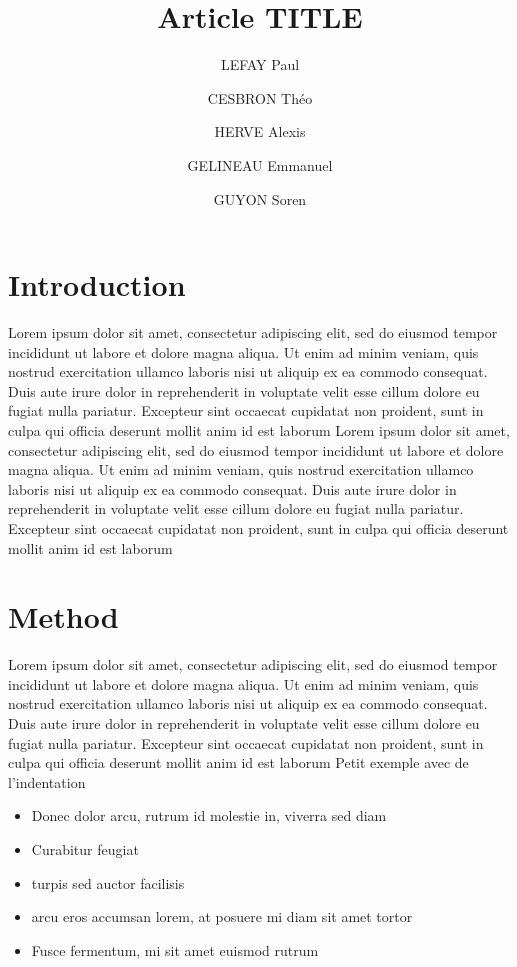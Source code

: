 \documentclass[twoside,twocolumn]{article}                          %
\title{Article TITLE}
\author[1]{LEFAY Paul}
\author[1]{CESBRON Théo}
\author[2]{HERVE Alexis}
\author[2]{GELINEAU Emmanuel}
\author[2]{GUYON Soren}
\affil[1]{DSMT}
\affil[2]{EOC}
\affil[3]{CSS}
\begin{document}
\renewcommand\thesection{\Roman{section}}                           %
\renewcommand\thesubsection{\roman{subsection}}                     %


\cfoot{\thepage}

\maketitle{}										                                    %

\newpage
\section{Introduction}
Lorem ipsum dolor sit amet, consectetur adipiscing elit, sed do eiusmod tempor incididunt ut labore et dolore magna aliqua. Ut enim ad minim veniam, quis nostrud exercitation ullamco laboris nisi ut aliquip ex ea commodo consequat. Duis aute irure dolor in reprehenderit in voluptate velit esse cillum dolore eu fugiat nulla pariatur. Excepteur sint occaecat cupidatat non proident, sunt in culpa qui officia deserunt mollit anim id est laborum
Lorem ipsum dolor sit amet, consectetur adipiscing elit, sed do eiusmod tempor incididunt ut labore et dolore magna aliqua. Ut enim ad minim veniam, quis nostrud exercitation ullamco laboris nisi ut aliquip ex ea commodo consequat. Duis aute irure dolor in reprehenderit in voluptate velit esse cillum dolore eu fugiat nulla pariatur. Excepteur sint occaecat cupidatat non proident, sunt in culpa qui officia deserunt mollit anim id est laborum

\section{Method}
Lorem ipsum dolor sit amet, consectetur adipiscing elit, sed do eiusmod tempor incididunt ut labore et dolore magna aliqua. Ut enim ad minim veniam, quis nostrud exercitation ullamco laboris nisi ut aliquip ex ea commodo consequat. Duis aute irure dolor in reprehenderit in voluptate velit esse cillum dolore eu fugiat nulla pariatur. Excepteur sint occaecat cupidatat non proident, sunt in culpa qui officia deserunt mollit anim id est laborum
Petit exemple avec de l'indentation
\begin{itemize}
  \item Donec dolor arcu, rutrum id molestie in, viverra sed diam
  \item Curabitur feugiat
  \item turpis sed auctor facilisis
  \item arcu eros accumsan lorem, at posuere mi diam sit amet tortor
  \item Fusce fermentum, mi sit amet euismod rutrum
\end{itemize}
\end{document}
